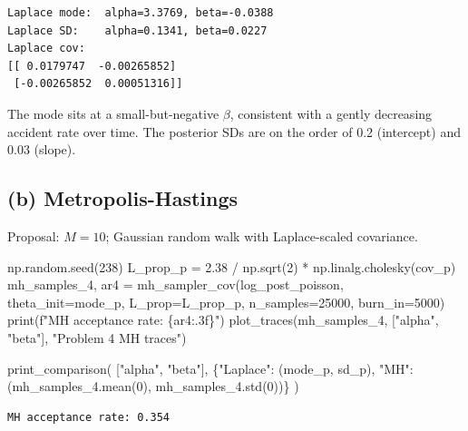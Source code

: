 \documentclass[
  letterpaper,
  DIV=11,
  numbers=noendperiod]{scrartcl}
\newenvironment{Shaded}{\begin{snugshade}}{\end{snugshade}}
\newcommand{\BuiltInTok}[1]{\textcolor[rgb]{0.00,0.23,0.31}{#1}}
\newcommand{\DecValTok}[1]{\textcolor[rgb]{0.68,0.00,0.00}{#1}}
\newcommand{\FloatTok}[1]{\textcolor[rgb]{0.68,0.00,0.00}{#1}}
\newcommand{\NormalTok}[1]{\textcolor[rgb]{0.00,0.23,0.31}{#1}}
\newcommand{\OperatorTok}[1]{\textcolor[rgb]{0.37,0.37,0.37}{#1}}
\newcommand{\SpecialCharTok}[1]{\textcolor[rgb]{0.37,0.37,0.37}{#1}}
\newcommand{\SpecialStringTok}[1]{\textcolor[rgb]{0.13,0.47,0.30}{#1}}
\newcommand{\StringTok}[1]{\textcolor[rgb]{0.13,0.47,0.30}{#1}}
\begin{document}
\begin{verbatim}
Laplace mode:  alpha=3.3769, beta=-0.0388
Laplace SD:    alpha=0.1341, beta=0.0227
Laplace cov:
[[ 0.0179747  -0.00265852]
 [-0.00265852  0.00051316]]
\end{verbatim}

The mode sits at a small-but-negative \(\beta\), consistent with a
gently decreasing accident rate over time. The posterior SDs are on the
order of 0.2 (intercept) and 0.03 (slope).

\subsection{(b) Metropolis-Hastings}\label{b-metropolis-hastings-2}

Proposal: \(M=10\); Gaussian random walk with Laplace-scaled covariance.

\begin{Shaded}
\begin{Highlighting}[]
\NormalTok{np.random.seed(}\DecValTok{238}\NormalTok{)}
\NormalTok{L\_prop\_p }\OperatorTok{=} \FloatTok{2.38} \OperatorTok{/}\NormalTok{ np.sqrt(}\DecValTok{2}\NormalTok{) }\OperatorTok{*}\NormalTok{ np.linalg.cholesky(cov\_p)}
\NormalTok{mh\_samples\_4, ar4 }\OperatorTok{=}\NormalTok{ mh\_sampler\_cov(log\_post\_poisson, theta\_init}\OperatorTok{=}\NormalTok{mode\_p,}
\NormalTok{                                   L\_prop}\OperatorTok{=}\NormalTok{L\_prop\_p, n\_samples}\OperatorTok{=}\DecValTok{25000}\NormalTok{, burn\_in}\OperatorTok{=}\DecValTok{5000}\NormalTok{)}
\BuiltInTok{print}\NormalTok{(}\SpecialStringTok{f"MH acceptance rate: }\SpecialCharTok{\{}\NormalTok{ar4}\SpecialCharTok{:.3f\}}\SpecialStringTok{"}\NormalTok{)}
\NormalTok{plot\_traces(mh\_samples\_4, [}\StringTok{"alpha"}\NormalTok{, }\StringTok{"beta"}\NormalTok{], }\StringTok{"Problem 4 MH traces"}\NormalTok{)}

\NormalTok{print\_comparison(}
\NormalTok{    [}\StringTok{"alpha"}\NormalTok{, }\StringTok{"beta"}\NormalTok{],}
\NormalTok{    \{}\StringTok{"Laplace"}\NormalTok{: (mode\_p, sd\_p),}
     \StringTok{"MH"}\NormalTok{:      (mh\_samples\_4.mean(}\DecValTok{0}\NormalTok{), mh\_samples\_4.std(}\DecValTok{0}\NormalTok{))\}}
\NormalTok{)}
\end{Highlighting}
\end{Shaded}

\begin{verbatim}
MH acceptance rate: 0.354
\end{verbatim}
\end{document}
